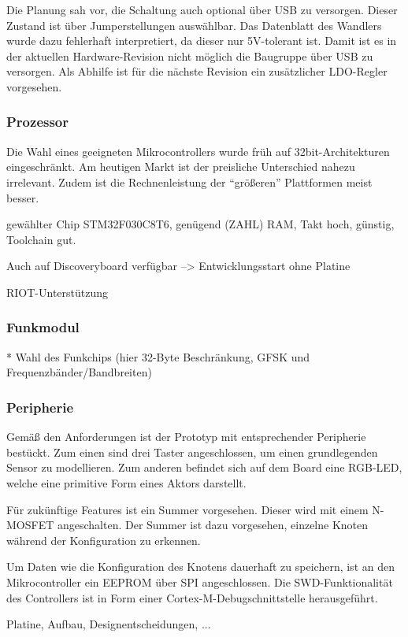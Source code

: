 \documentclass{IEEEtran}
\begin{document}
Die Planung sah vor, die Schaltung auch optional über USB zu versorgen.
Dieser Zustand ist über Jumperstellungen auswählbar.
Das Datenblatt des Wandlers wurde dazu fehlerhaft interpretiert, da dieser nur 5V-tolerant ist.
Damit ist es in der aktuellen Hardware-Revision nicht möglich die Baugruppe über USB zu versorgen.
Als Abhilfe ist für die nächste Revision ein zusätzlicher LDO-Regler vorgesehen.

\subsubsection{Prozessor}
Die Wahl eines geeigneten Mikrocontrollers wurde früh auf 32bit-Architekturen eingeschränkt.
Am heutigen Markt ist der preisliche Unterschied nahezu irrelevant.
Zudem ist die Rechnenleistung der \enquote{größeren} Plattformen meist besser.

gewählter Chip STM32F030C8T6, genügend (ZAHL) RAM, Takt hoch, günstig, Toolchain gut.

Auch auf Discoveryboard verfügbar --> Entwicklungsstart ohne Platine

RIOT-Unterstützung

\subsubsection{Funkmodul}
* Wahl des Funkchips (hier 32-Byte Beschränkung, GFSK und Frequenzbänder/Bandbreiten)

\subsubsection{Peripherie}
Gemäß den Anforderungen ist der Prototyp mit entsprechender Peripherie bestückt.
Zum einen sind drei Taster angeschlossen, um einen grundlegenden Sensor zu modellieren.
Zum anderen befindet sich auf dem Board eine RGB-LED, welche eine primitive Form eines Aktors darstellt.

Für zukünftige Features ist ein Summer vorgesehen.
Dieser wird mit einem N-MOSFET angeschalten.
Der Summer ist dazu vorgesehen, einzelne Knoten während der Konfiguration zu erkennen.

Um Daten wie die Konfiguration des Knotens dauerhaft zu speichern, ist an den Mikrocontroller ein EEPROM über SPI angeschlossen.
Die SWD-Funktionalität des Controllers ist in Form einer Cortex-M-Debugschnittstelle herausgeführt.




    Platine, Aufbau, Designentscheidungen, ...
\end{document}

